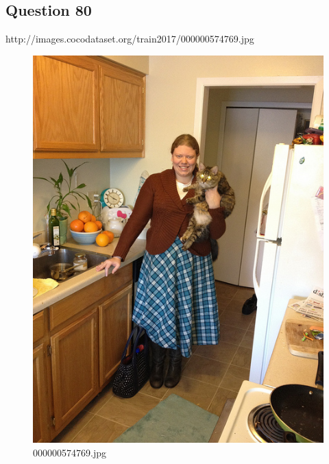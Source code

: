 \subsection*{Question 80}
http://images.cocodataset.org/train2017/000000574769.jpg
\begin{figure}[h]
    \centering
    \includegraphics[width=0.8\linewidth]{../image set/hard/000000574769.jpg}
    \caption{000000574769.jpg}
\end{figure}
